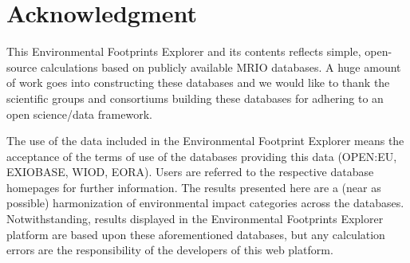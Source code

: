 \section*{Acknowledgment}

 This Environmental Footprints Explorer and its contents reflects simple, open-source calculations based on publicly available MRIO databases. A huge amount of work goes into constructing these databases and we would like to thank the scientific groups and consortiums building these databases for adhering to an open science/data framework.
 
 The use of the data included in the Environmental Footprint Explorer means the acceptance of the terms of use of the databases providing this data (OPEN:EU, EXIOBASE, WIOD, EORA). Users are referred to the respective database homepages for further information. The results presented here are a (near as possible) harmonization of environmental impact categories across the databases. Notwithstanding, results displayed in the Environmental Footprints Explorer platform are based upon these aforementioned databases, but any calculation errors are the responsibility of the developers of this web platform.

    